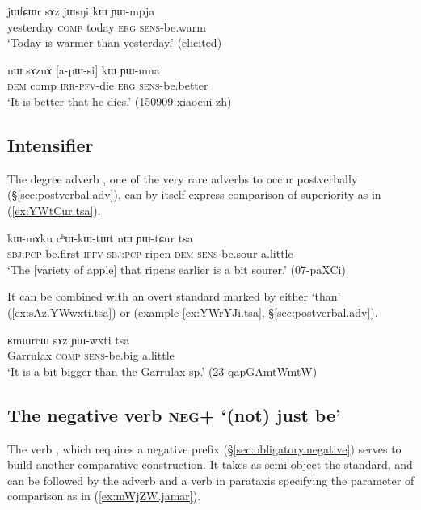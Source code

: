 \begin{exe}
\ex \label{ex:comparative2}
\gll  jɯfɕɯr sɤz jɯsŋi kɯ ɲɯ-mpja \\
yesterday \textsc{comp} today \textsc{erg} \textsc{sens}-be.warm \\
\glt `Today is warmer than yesterday.' (elicited)
\end{exe}

\begin{exe}
\ex \label{ex:apWsi.kW}
\gll nɯ sɤznɤ [a-pɯ-si] kɯ ɲɯ-mna \\
\textsc{dem} comp \textsc{irr}-\textsc{pfv}-die \textsc{erg} \textsc{sens}-be.better \\
\glt `It is better that he dies.' (150909 xiaocui-zh)
\end{exe}

\subsection{Intensifier    } \label{sec:comparative.tsa}
The degree adverb , one of the very rare adverbs to occur postverbally (§\ref{sec:postverbal.adv}), can by itself express comparison of superiority as in (\ref{ex:YWtCur.tsa}).

\begin{exe}
\ex \label{ex:YWtCur.tsa}
\gll  kɯ-mɤku cʰɯ-kɯ-tɯt nɯ ɲɯ-tɕur tsa \\
\textsc{sbj}:\textsc{pcp}-be.first \textsc{ipfv}-\textsc{sbj}:\textsc{pcp}-ripen \textsc{dem} \textsc{sens}-be.sour a.little\\
\glt `The [variety of apple] that ripens earlier is a bit sourer.' (07-paXCi)
\end{exe}

It can be combined with an overt standard marked by either  `than' (\ref{ex:sAz.YWwxti.tsa}) or  (example \ref{ex:YWrYJi.tsa}, §\ref{sec:postverbal.adv}).

\begin{exe}
\ex \label{ex:sAz.YWwxti.tsa}
\gll  ʁmɯrcɯ sɤz ɲɯ-wxti tsa \\
Garrulax \textsc{comp} \textsc{sens}-be.big a.little \\
\glt `It is a bit bigger than the Garrulax sp.' (23-qapGAmtWmtW)
\end{exe}

\subsection{The negative verb \textsc{neg}+ `(not) just be'} \label{sec:mAZW}
The verb , which requires a negative prefix (§\ref{sec:obligatory.negative}) serves to build another comparative construction. It takes as semi-object the standard, and can be followed by the adverb  and a verb in parataxis specifying the parameter of comparison as in (\ref{ex:mWjZW.jamar}).

